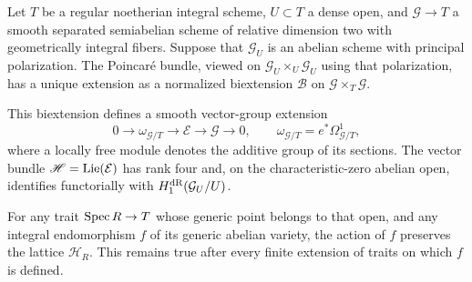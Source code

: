 \begin{proposition}\label{ht:integral-model}
Let $T$ be a regular noetherian integral scheme, $U\subset T$ a dense
open, and $\mathcal G\to T$ a smooth separated semiabelian scheme of
relative dimension two with geometrically integral fibers. Suppose that
$\mathcal G_U$ is an abelian scheme with principal polarization.
The Poincar\'e bundle, viewed on
$\mathcal G_U\times_U\mathcal G_U$ using that polarization, has a
unique extension as a normalized biextension $\mathscr B$ on
$\mathcal G\times_T\mathcal G$.

This biextension defines a smooth vector-group extension
\begin{equation}\label{ht:vector-extension}
 0\longrightarrow\omega_{\mathcal G/T}
 \longrightarrow\mathcal E\longrightarrow\mathcal G
 \longrightarrow0,
 \qquad \omega_{\mathcal G/T}=e^*\Omega^1_{\mathcal G/T},
\end{equation}
where a locally free module denotes the additive group of its sections.
The vector bundle $\mathscr H=\operatorname{Lie}(\mathcal E)$ has rank four and,
on the characteristic-zero abelian open, identifies functorially with
$H_1^{\rm dR}(\mathcal G_U/U)$.

For any trait $\operatorname{Spec} R\to T$ whose generic point belongs to that open,
and any integral endomorphism $f$ of its generic abelian variety, the
action of $f$ preserves the lattice $\mathscr H_R$. This remains true
after every finite extension of traits on which $f$ is defined.
\end{proposition}

